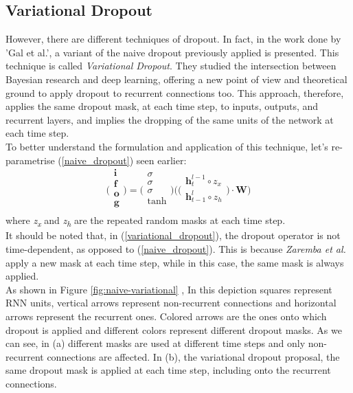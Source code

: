 \documentclass[a4paper]{article}
\begin{document}
\subsection{Variational Dropout}
However, there are different techniques of dropout. In fact, in the work done by 'Gal et al.'\cite{gal-dropout}, a variant of the naive dropout \cite{zaremba-rnn} previously applied is presented. This technique is called \textit{Variational Dropout}. They studied the intersection between Bayesian research and deep learning, offering a new point of view and theoretical ground to apply dropout to recurrent connections too.
This approach, therefore, applies the same dropout mask, at each time step, to inputs, outputs, and recurrent layers, and implies the dropping of the same units of the network at each time step.
\\
To better understand the formulation and application of this technique, let's re-parametrise (\ref{naive_dropout}) seen earlier:
\begin{equation}
\Biggl(
\begin{array}{cc}
     \textbf{i}\\\textbf{f}\\\textbf{o}\\\textbf{g}\\
\end{array}
\Biggl) = 
\Biggl(
\begin{array}{cc}
     \sigma\\\sigma\\\sigma\\\tanh\\
\end{array}
\Biggl)
\biggl(
\biggl(
\begin{array}{cc}
     \textbf{h}_{t}^{l-1}\circ z_{x}\\\textbf{h}_{t-1}^{l} \circ z_{h}\\
\end{array}
\biggl) \cdot \textbf{W}
\biggl)
\label{variational_dropout} 
\end{equation}
where \textit{z\textsubscript{x}} and \textit{z\textsubscript{h}} are the repeated random masks at each time step.\\
It should be noted that, in (\ref{variational_dropout}), the dropout operator is not time-dependent, as opposed to (\ref{naive_dropout}). This is because \textit{Zaremba et al.} \cite{zaremba-rnn} apply a new mask at each time step, while in this case, the same mask is always applied.
\\
As shown in Figure \ref{fig:naive-variational} \cite{gal-dropout}, In this depiction squares represent RNN units, vertical arrows represent non-recurrent connections and horizontal arrows represent the recurrent ones. Colored arrows are the ones onto which dropout is applied and different colors represent different dropout masks. As we can see, in (a) different masks are used at different time steps and only non-recurrent connections are affected. In (b), the variational dropout proposal, the same dropout mask is applied at each time step, including onto the recurrent connections.
\end{document}
